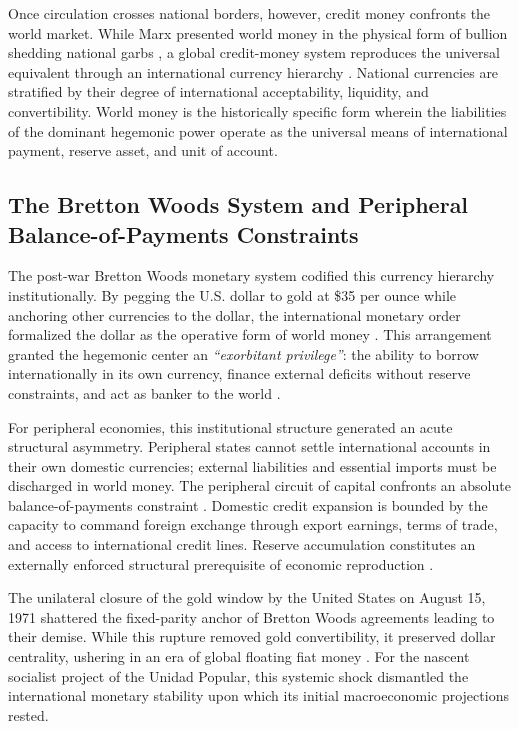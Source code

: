 Once circulation crosses national borders, however, credit money confronts the world market. While Marx presented world money in the physical form of bullion shedding national garbs \citep[p.~51]{Ivanova2013}, a global credit-money system reproduces the universal equivalent through an international currency hierarchy \citep{Vasudevan2009,Ivanova2020}. National currencies are stratified by their degree of international acceptability, liquidity, and convertibility. World money is the historically specific form wherein the liabilities of the dominant hegemonic power operate as the universal means of international payment, reserve asset, and unit of account.

\subsection{The Bretton Woods System and Peripheral Balance-of-Payments Constraints}
\label{sec:B2_BrettonWoods_BOP}

The post-war Bretton Woods monetary system codified this currency hierarchy institutionally. By pegging the U.S. dollar to gold at \$35 per ounce while anchoring other currencies to the dollar, the international monetary order formalized the dollar as the operative form of world money \citep[p.~483]{Vasudevan2009}. This arrangement granted the hegemonic center an \textit{``exorbitant privilege''}: the ability to borrow internationally in its own currency, finance external deficits without reserve constraints, and act as banker to the world \citep[pp.~243--244]{Vasudevan2019}.

For peripheral economies, this institutional structure generated an acute structural asymmetry. Peripheral states cannot settle international accounts in their own domestic currencies; external liabilities and essential imports must be discharged in world money. The peripheral circuit of capital confronts an absolute balance-of-payments constraint \citep{Vasudevan2016,Abeles2013}. Domestic credit expansion is bounded by the capacity to command foreign exchange through export earnings, terms of trade, and access to international credit lines. Reserve accumulation constitutes an externally enforced structural prerequisite of economic reproduction \citep[p.~244]{Vasudevan2019}.

The unilateral closure of the gold window by the United States on August 15, 1971 shattered the fixed-parity anchor of Bretton Woods agreements leading to their demise. While this rupture removed gold convertibility, it preserved dollar centrality, ushering in an era of global floating fiat money \citep[p.~486]{Vasudevan2009}. For the nascent socialist project of the Unidad Popular, this systemic shock dismantled the international monetary stability upon which its initial macroeconomic projections rested.

